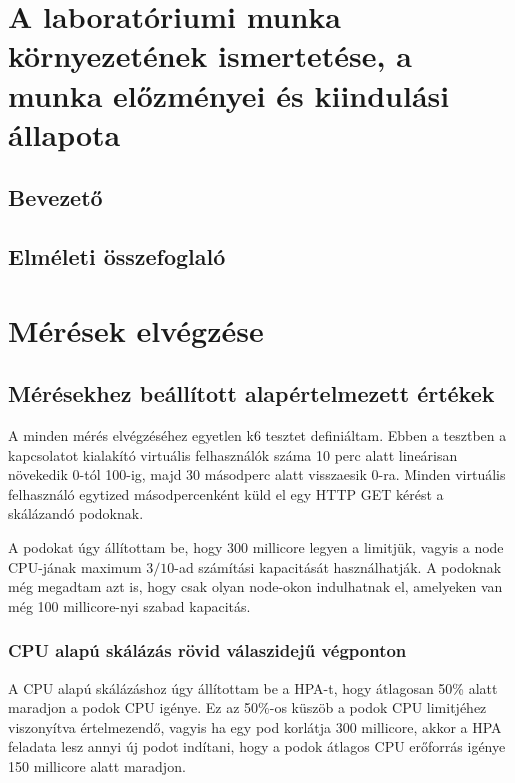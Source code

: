 \documentclass[a4paper,oneside]{article}
\begin{document}
\section{A laboratóriumi munka környezetének ismertetése,
     a munka előzményei és kiindulási állapota}
\label{sec:kornyezet}
\subsection{Bevezető}
\label{sec:bevezeto}

\subsection{Elméleti összefoglaló}

\newpage
\section{Mérések elvégzése}
\label{sec:az-elvegzett-munka}

\subsection{Mérésekhez beállított alapértelmezett értékek}

A minden mérés elvégzéséhez egyetlen k6 tesztet definiáltam. Ebben a tesztben a
kapcsolatot kialakító virtuális felhasználók száma 10 perc alatt lineárisan
növekedik 0-tól 100-ig, majd 30 másodperc alatt visszaesik 0-ra. Minden
virtuális felhasználó egytized másodpercenként küld el egy HTTP GET kérést a
skálázandó podoknak.

A podokat úgy állítottam be, hogy 300 millicore legyen a limitjük, vagyis a node
CPU-jának maximum $3/10$-ad számítási kapacitását használhatják. A podoknak még
megadtam azt is, hogy csak olyan node-okon indulhatnak el, amelyeken van még 100
millicore-nyi szabad kapacitás.

\subsubsection{CPU alapú skálázás rövid válaszidejű végponton}
\label{secsec:cpu_scaling}

A CPU alapú skálázáshoz úgy állítottam be a HPA-t, hogy átlagosan 50\% alatt
maradjon a podok CPU igénye. Ez az 50\%-os küszöb a podok CPU limitjéhez
viszonyítva értelmezendő, vagyis ha egy pod korlátja 300 millicore, akkor a HPA
feladata lesz annyi új podot indítani, hogy a podok átlagos CPU erőforrás igénye
150 millicore alatt maradjon.
\end{document}
